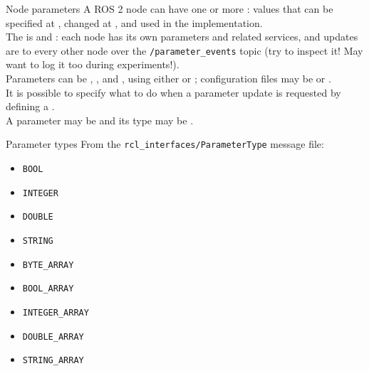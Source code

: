 \begin{frame}{Node parameters}
  \justifying
	A ROS 2 node can have one or more : values that can be specified at , changed at , and used in the implementation.\\
  \bigskip
	The  is  and : each node has its own parameters and related services, and updates are  to every other node over the \texttt{/parameter\_events} topic (try to inspect it! May want to log it too during experiments!).\\
  \bigskip
	Parameters can be , ,  and , using either  or ;  configuration files may be  or .\\
  \bigskip
	It is possible to specify what to do when a parameter update is requested by defining a .\\
  \bigskip
	A parameter may be  and its type may be .
\end{frame}

\begin{frame}{Parameter types}
  \justifying
	From the \texttt{rcl\_interfaces/ParameterType} message file:
	\begin{itemize}
		\item \texttt{BOOL}
		\item \texttt{INTEGER}
		\item \texttt{DOUBLE}
		\item \texttt{STRING}
		\item \texttt{BYTE\_ARRAY}
		\item \texttt{BOOL\_ARRAY}
		\item \texttt{INTEGER\_ARRAY}
		\item \texttt{DOUBLE\_ARRAY}
		\item \texttt{STRING\_ARRAY}
	\end{itemize}
\end{frame}


